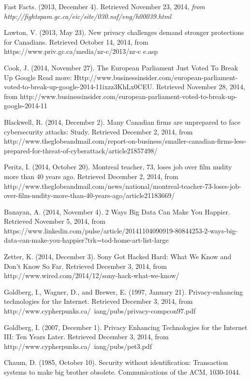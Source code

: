 \documentclass[12pt]{article}
\begin{document}
\begin{thebibliography}{99}
	Fast Facts. (2013, December 4). Retrieved November 23, 2014, {\sl from http://fightspam.gc.ca/eic/site/030.nsf/eng/h\textunderscore00039.html}

	Lawton, V. (2013, May 23). New privacy challenges demand stronger protections for Canadians. Retrieved October 14, 2014, from https://www.priv.gc.ca/media/nr-c/2013/nr-c \textunderscore e.asp

	Cook, J. (2014, November 27). The European Parliament Just Voted To Break Up Google Read more: Http://www.businessinsider.com/european-parliament-voted-to-break-up-google-2014-11ixzz3KhLx0CEU. Retrieved November 28, 2014, from http://www.businessinsider.com/european-parliament-voted-to-break-up-google-2014-11

	Blackwell, R. (2014, December 2). Many Canadian firms are unprepared to face cybersecurity attacks: Study. Retrieved December 2, 2014, from http://www.theglobeandmail.com/report-on-business/smaller-canadian-firms-less-prepared-for-threat-of-cyberattack/article21857498/

	Peritz, I. (2014, October 20). Montreal teacher, 73, loses job over film nudity more than 40 years ago. Retrieved December 2, 2014, from http://www.theglobeandmail.com/news/national/montreal-teacher-73-loses-job-over-film-nudity-more-than-40-years-ago/article21183669/

	Banayan, A. (2014, November 4). 2 Ways Big Data Can Make You Happier. Retrieved November 5, 2014, from https://www.linkedin.com/pulse/article/20141104090919-80844253-2-ways-big-data-can-make-you-happier?trk=tod-home-art-list-large

	Zetter, K. (2014, December 3). Sony Got Hacked Hard: What We Know and Don’t Know So Far. Retrieved December 3, 2014, from http://www.wired.com/2014/12/sony-hack-what-we-know/

	Goldberg, I., Wagner, D., and Brewer, E. (1997, January 21). Privacy-enhancing technologies for the Internet. Retrieved December 3, 2014, from http://www.cypherpunks.ca/~iang/pubs/privacy-compcon97.pdf

	Goldberg, I. (2007, December 1). Privacy Enhancing Technologies for the Internet III: Ten Years Later. Retrieved December 3, 2014, from http://www.cypherpunks.ca/~iang/pubs/pet3.pdf

	Chaum, D. (1985, October 10). Security without identification: Transaction systems to make big brother obsolete. Communications of the ACM, 1030-1044.
\end{thebibliography}
\end{document}
